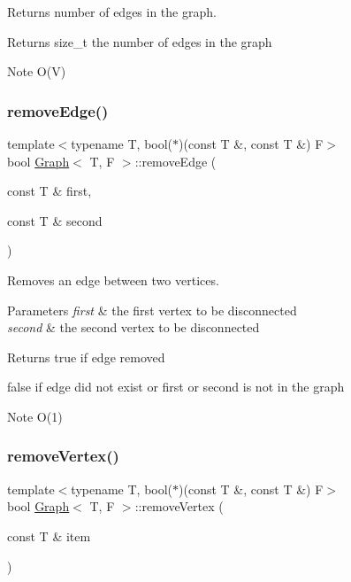 Returns number of edges in the graph. 

\begin{DoxyReturn}{Returns}
size\+\_\+t the number of edges in the graph
\end{DoxyReturn}
\begin{DoxyNote}{Note}
O(\+V) 
\end{DoxyNote}
\mbox{\label{class_graph_afec0f8270f77a9b54f6528a4e7182c84}} 
\subsubsection{\texorpdfstring{remove\+Edge()}{removeEdge()}}
{\footnotesize\ttfamily template$<$typename T, bool($\ast$)(const T \&, const T \&) F$>$ \\
bool \hyperlink{class_graph}{Graph}$<$ T, F $>$\+::remove\+Edge (\begin{DoxyParamCaption}\item[{const T \&}]{first,  }\item[{const T \&}]{second }\end{DoxyParamCaption})}



Removes an edge between two vertices. 


\begin{DoxyParams}{Parameters}
{\em first} & the first vertex to be disconnected \\
\hline
{\em second} & the second vertex to be disconnected \\
\hline
\end{DoxyParams}
\begin{DoxyReturn}{Returns}
true if edge removed 

false if edge did not exist or first or second is not in the graph
\end{DoxyReturn}
\begin{DoxyNote}{Note}
O(1) 
\end{DoxyNote}
\mbox{\label{class_graph_ab60cdf74dfbd8c7682b760338fb8a952}} 
\subsubsection{\texorpdfstring{remove\+Vertex()}{removeVertex()}}
{\footnotesize\ttfamily template$<$typename T, bool($\ast$)(const T \&, const T \&) F$>$ \\
bool \hyperlink{class_graph}{Graph}$<$ T, F $>$\+::remove\+Vertex (\begin{DoxyParamCaption}\item[{const T \&}]{item }\end{DoxyParamCaption})}



